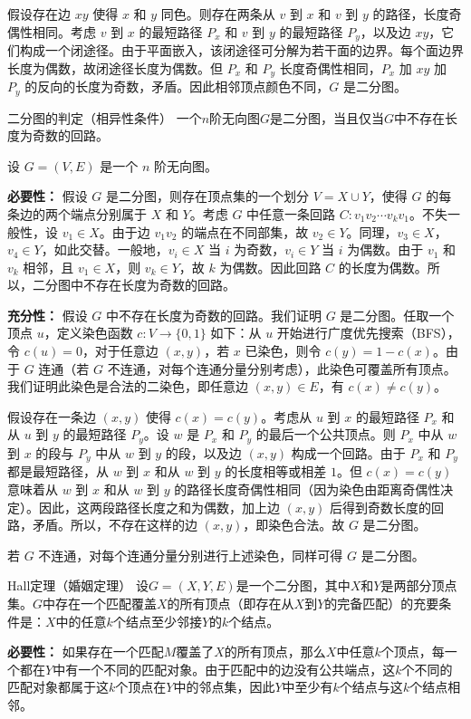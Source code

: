     假设存在边 $xy$ 使得 $x$ 和 $y$ 同色。则存在两条从 $v$ 到 $x$ 和 $v$ 到 $y$ 的路径，长度奇偶性相同。考虑 $v$ 到 $x$ 的最短路径 $P_x$ 和 $v$ 到 $y$ 的最短路径 $P_y$，以及边 $xy$，它们构成一个闭途径。由于平面嵌入，该闭途径可分解为若干面的边界。每个面边界长度为偶数，故闭途径长度为偶数。但 $P_x$ 和 $P_y$ 长度奇偶性相同，$P_x$ 加 $xy$ 加 $P_y$ 的反向的长度为奇数，矛盾。因此相邻顶点颜色不同，$G$ 是二分图。

\begin{theorem}{二分图的判定（相异性条件）}{}
    一个$n$阶无向图$G$是二分图，当且仅当$G$中不存在长度为奇数的回路。
\end{theorem}
设 $G=(V,E)$ 是一个 $n$ 阶无向图。

    \textbf{必要性：} 假设 $G$ 是二分图，则存在顶点集的一个划分 $V = X \cup Y$，使得 $G$ 的每条边的两个端点分别属于 $X$ 和 $Y$。考虑 $G$ 中任意一条回路 $C: v_1 v_2 \cdots v_k v_1$。不失一般性，设 $v_1 \in X$。由于边 $v_1v_2$ 的端点在不同部集，故 $v_2 \in Y$。同理，$v_3 \in X$，$v_4 \in Y$，如此交替。一般地，$v_i \in X$ 当 $i$ 为奇数，$v_i \in Y$ 当 $i$ 为偶数。由于 $v_1$ 和 $v_k$ 相邻，且 $v_1 \in X$，则 $v_k \in Y$，故 $k$ 为偶数。因此回路 $C$ 的长度为偶数。所以，二分图中不存在长度为奇数的回路。

    \textbf{充分性：} 假设 $G$ 中不存在长度为奇数的回路。我们证明 $G$ 是二分图。任取一个顶点 $u$，定义染色函数 $c: V \to \{0,1\}$ 如下：从 $u$ 开始进行广度优先搜索（BFS），令 $c(u)=0$，对于任意边 $(x,y)$，若 $x$ 已染色，则令 $c(y)=1-c(x)$。由于 $G$ 连通（若 $G$ 不连通，对每个连通分量分别考虑），此染色可覆盖所有顶点。我们证明此染色是合法的二染色，即任意边 $(x,y) \in E$，有 $c(x) \neq c(y)$。

    假设存在一条边 $(x,y)$ 使得 $c(x)=c(y)$。考虑从 $u$ 到 $x$ 的最短路径 $P_x$ 和从 $u$ 到 $y$ 的最短路径 $P_y$。设 $w$ 是 $P_x$ 和 $P_y$ 的最后一个公共顶点。则 $P_x$ 中从 $w$ 到 $x$ 的段与 $P_y$ 中从 $w$ 到 $y$ 的段，以及边 $(x,y)$ 构成一个回路。由于 $P_x$ 和 $P_y$ 都是最短路径，从 $w$ 到 $x$ 和从 $w$ 到 $y$ 的长度相等或相差 $1$。但 $c(x)=c(y)$ 意味着从 $w$ 到 $x$ 和从 $w$ 到 $y$ 的路径长度奇偶性相同（因为染色由距离奇偶性决定）。因此，这两段路径长度之和为偶数，加上边 $(x,y)$ 后得到奇数长度的回路，矛盾。所以，不存在这样的边 $(x,y)$，即染色合法。故 $G$ 是二分图。

    若 $G$ 不连通，对每个连通分量分别进行上述染色，同样可得 $G$ 是二分图。

\begin{theorem}{Hall定理（婚姻定理）}{}
    设$G=(X,Y,E)$是一个二分图，其中$X$和$Y$是两部分顶点集。$G$中存在一个匹配覆盖$X$的所有顶点（即存在从$X$到$Y$的完备匹配）的充要条件是：$X$中的任意$k$个结点至少邻接$Y$的$k$个结点。
\end{theorem}
\textbf{必要性：} 如果存在一个匹配$M$覆盖了$X$的所有顶点，那么$X$中任意$k$个顶点，每一个都在$Y$中有一个不同的匹配对象。由于匹配中的边没有公共端点，这$k$个不同的匹配对象都属于这$k$个顶点在$Y$中的邻点集，因此$Y$中至少有$k$个结点与这$k$个结点相邻。


